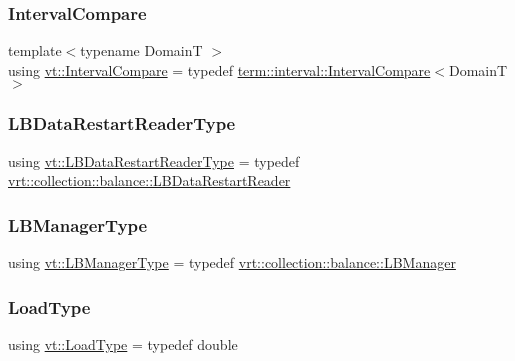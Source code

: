 \subsubsection{\texorpdfstring{Interval\+Compare}{IntervalCompare}}
{\footnotesize\ttfamily template$<$typename DomainT $>$ \\
using \hyperlink{namespacevt_ab51b754f1d22841f555246195fab9d41}{vt\+::\+Interval\+Compare} = typedef \hyperlink{structvt_1_1term_1_1interval_1_1_interval_compare}{term\+::interval\+::\+Interval\+Compare}$<$DomainT$>$}

\mbox{\label{namespacevt_afa4cbc17d753afab37e21dd902f68e9e}} 
\subsubsection{\texorpdfstring{L\+B\+Data\+Restart\+Reader\+Type}{LBDataRestartReaderType}}
{\footnotesize\ttfamily using \hyperlink{namespacevt_afa4cbc17d753afab37e21dd902f68e9e}{vt\+::\+L\+B\+Data\+Restart\+Reader\+Type} = typedef \hyperlink{structvt_1_1vrt_1_1collection_1_1balance_1_1_l_b_data_restart_reader}{vrt\+::collection\+::balance\+::\+L\+B\+Data\+Restart\+Reader}}

\mbox{\label{namespacevt_a1ae0212259259772d2e857f497714e1b}} 
\subsubsection{\texorpdfstring{L\+B\+Manager\+Type}{LBManagerType}}
{\footnotesize\ttfamily using \hyperlink{namespacevt_a1ae0212259259772d2e857f497714e1b}{vt\+::\+L\+B\+Manager\+Type} = typedef \hyperlink{structvt_1_1vrt_1_1collection_1_1balance_1_1_l_b_manager}{vrt\+::collection\+::balance\+::\+L\+B\+Manager}}

\mbox{\label{namespacevt_a8fb51741340b87d7aaee0bef60e9896b}} 
\subsubsection{\texorpdfstring{Load\+Type}{LoadType}}
{\footnotesize\ttfamily using \hyperlink{namespacevt_a8fb51741340b87d7aaee0bef60e9896b}{vt\+::\+Load\+Type} = typedef double}




